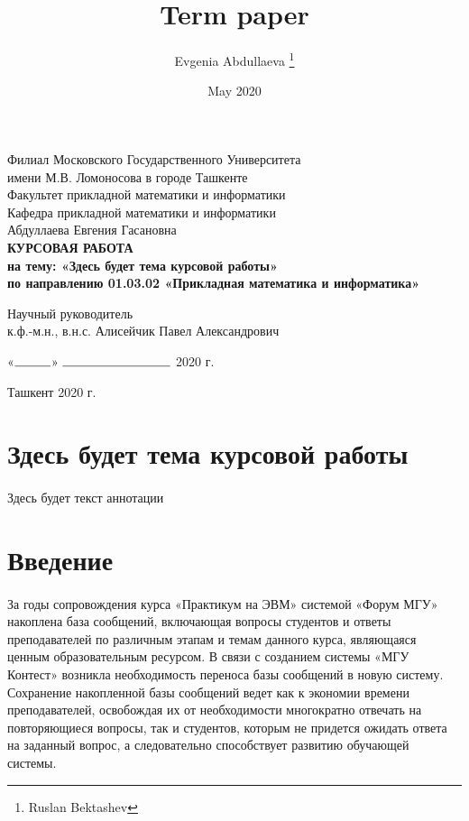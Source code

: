 \documentclass[12pt, a4paper, oneside]{article}
\title{Term paper}
\author{Evgenia Abdullaeva \thanks{Ruslan Bektashev}}
\date{May 2020}
\begin{document}
\begin{titlepage}
    \begin{center}
        Филиал Московского Государственного Университета\\
        имени М.В. Ломоносова в городе Ташкенте\\
        \vspace{0.5cm}
        Факультет прикладной математики и информатики\\
        Кафедра прикладной математики и информатики\\
        \vfill
        Абдуллаева Евгения Гасановна\\
        \vfill
        \textbf{КУРСОВАЯ РАБОТА\\
        на тему: «Здесь будет тема курсовой работы»\\
        \vspace{0.5cm}
        по направлению 01.03.02 «Прикладная математика и информатика»}
    \end{center}
    \vfill
    \begin{flushleft}
        Научный руководитель\\
        к.ф.-м.н., в.н.с. Алисейчик Павел Александрович
    \end{flushleft}
    \vspace{0.5cm}
    \begin{flushright}
        «$\rule{1cm}{0.15mm}$» $\rule{3cm}{0.15mm}$ 2020 г.
    \end{flushright}
    \vfill
    \begin{center}
        Ташкент 2020 г.
    \end{center}
\end{titlepage}

\section*{Здесь будет тема курсовой работы}
\paragraph{}
Здесь будет текст аннотации
\setcounter{page}{2}
\newpage

\tableofcontents
\newpage

\section{Введение}
\paragraph{} %
За годы сопровождения курса «Практикум на ЭВМ» системой «Форум МГУ» накоплена база сообщений, включающая вопросы студентов и ответы преподавателей по различным этапам и темам данного курса, являющаяся ценным образовательным ресурсом. В связи с созданием системы «МГУ Контест» возникла необходимость переноса базы сообщений в новую систему. Сохранение накопленной базы сообщений ведет как к экономии времени преподавателей, освобождая их от необходимости многократно отвечать на повторяющиеся вопросы, так и студентов, которым не придется ожидать ответа на заданный вопрос, а следовательно способствует развитию обучающей системы.
\end{document}
